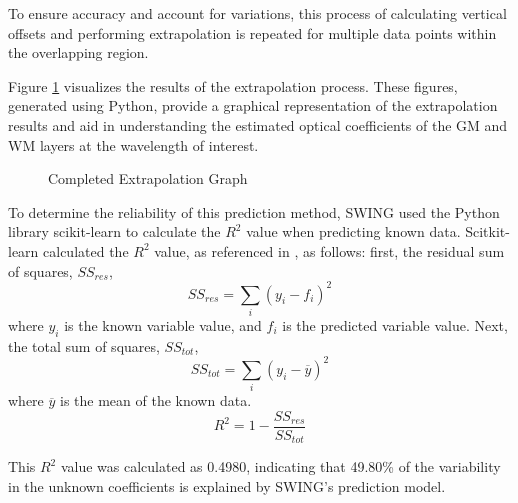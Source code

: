 \documentclass[journal,twoside,web]{ieeecolor}
\begin{document}
To ensure accuracy and account for variations, this process of calculating vertical offsets and performing extrapolation is repeated for 
multiple data points within the overlapping region.

Figure \ref{fig:Extrapolation} visualizes the results of the extrapolation process.  These figures, generated using Python, provide a graphical representation of the 
extrapolation results and aid in understanding the estimated optical coefficients of the GM and WM layers at the wavelength of interest.
\begin{figure}[htb]
    \caption{\label{fig:Extrapolation} Completed Extrapolation Graph}
\end{figure}

To determine the reliability of this prediction method, SWING used the Python library scikit-learn\cite{b7} 
to calculate the $R^2$ value when predicting known data. Scitkit-learn calculated the $R^2$ value, as referenced in \cite{b7}, as follows:
first, the residual sum of squares, $SS_{res}$,
\begin{equation}
    \label{eq:ResidSumSquares}
    SS_{res} = \sum_{i}{(y_i-f_i)^2}
\end{equation}
where $y_i$ is the known variable value, and $f_i$ is the predicted variable value.
Next, the total sum of squares, $SS_{tot}$,
\begin{equation}
    \label{eq:TotSumSquares}
    SS_{tot} = \sum_{i}{(y_i-\overline{y})^2}
\end{equation}
where $\overline{y}$ is the mean of the known data.
\begin{equation}
    \label{eq:CoeffDeterm}
    R^2 = 1 - \frac{SS_{res}}{SS_{tot}}
\end{equation}

This $R^2$ value was calculated as 0.4980, indicating that 49.80\% of the variability in the unknown coefficients is 
explained by SWING's prediction model.
\end{document}
